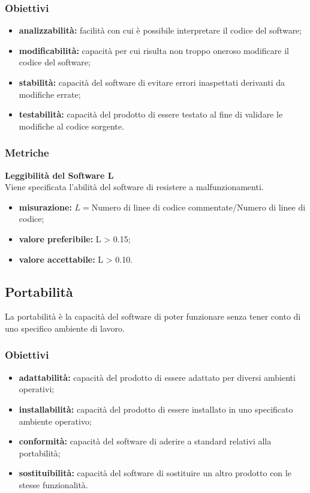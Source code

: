 \subsubsection{Obiettivi}
\begin{itemize}
	\item \textbf{analizzabilità:} facilità con cui è possibile interpretare il codice del software;
	\item \textbf{modificabilità:} capacità per cui risulta non troppo oneroso modificare il codice del software;
	\item \textbf{stabilità:} capacità del software di evitare errori inaspettati derivanti da modifiche errate;
	\item \textbf{testabilità:} capacità del prodotto di essere testato al fine di validare le modifiche al codice sorgente.
\end{itemize}
\subsubsection{Metriche}
\textbf{Leggibilità del Software L}\\
Viene specificata l'abilità del software di resistere a malfunzionamenti.
\begin{itemize}
	\item \textbf{misurazione:} $L = $Numero di linee di codice commentate$ / $Numero di linee di codice;
	\item \textbf{valore preferibile:} L > 0.15;
	\item \textbf{valore accettabile:} L > 0.10.
\end{itemize}


\subsection{Portabilità}
La portabilità è la capacità del software di poter funzionare senza tener conto di uno specifico ambiente di lavoro.
\subsubsection{Obiettivi}
\begin{itemize}
	\item \textbf{adattabilità:} capacità del prodotto di essere adattato per diversi ambienti operativi;
	\item \textbf{installabilità:} capacità del prodotto di essere installato in uno specificato ambiente operativo;
	\item \textbf{conformità:} capacità del software di aderire a standard relativi alla portabilità;
	\item \textbf{sostituibilità:} capacità del software di sostituire un altro prodotto con le stesse funzionalità.
\end{itemize}
